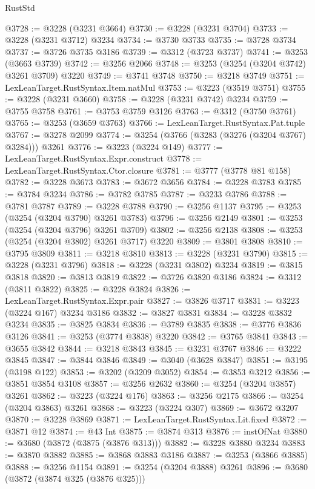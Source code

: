 \begin{lexlean}{RustStd}
\begin{coremodule}
{\begin{coremodule}
{{{{{{{{{{{{{{{{{{{{{{{{{{{{{{{{{{{{{@3728 := @3228 (@3231 @3664)
@3730 := @3228 (@3231 @3704)
@3733 := @3228 (@3231 @3712) @3234
@3734 := @3730 @3733
@3735 := @3728 @3734
@3737 := @3726 @3735 @3186
@3739 := @3312 (@3723 @3737)
@3741 := @3253 (@3663 @3739)
@3742 := @3256 @2066
@3748 := @3253 (@3254 (@3204 @3742) @3261 @3709) @3220
@3749 := @3741 @3748
@3750 := @3218 @3749
@3751 := LexLeanTarget.RustSyntax.Item.natMul
@3753 := @3223 (@3519 @3751)
@3755 := @3228 (@3231 @3660)
@3758 := @3228 (@3231 @3742) @3234
@3759 := @3755 @3758
@3761 := @3753 @3759 @3126
@3763 := @3312 (@3750 @3761)
@3765 := @3253 (@3659 @3763)
@3766 := LexLeanTarget.RustSyntax.Pat.tuple
@3767 := @3278 @2099
@3774 := @3254 (@3766 (@3283 (@3276 (@3204 @3767) @3284))) @3261
@3776 := @3223 (@3224 @149)
@3777 := LexLeanTarget.RustSyntax.Expr.construct
@3778 := LexLeanTarget.RustSyntax.Ctor.closure
@3781 := @3777 (@3778 @81 @158)
@3782 := @3228 @3673
@3783 := @3672 @3656
@3784 := @3228 @3783
@3785 := @3784 @3234
@3786 := @3782 @3785
@3787 := @3233 @3786
@3788 := @3781 @3787
@3789 := @3228 @3788
@3790 := @3256 @1137
@3795 := @3253 (@3254 (@3204 @3790) @3261 @3783)
@3796 := @3256 @2149
@3801 := @3253 (@3254 (@3204 @3796) @3261 @3709)
@3802 := @3256 @2138
@3808 := @3253 (@3254 (@3204 @3802) @3261 @3717) @3220
@3809 := @3801 @3808
@3810 := @3795 @3809
@3811 := @3218 @3810
@3813 := @3228 (@3231 @3790)
@3815 := @3228 (@3231 @3796)
@3818 := @3228 (@3231 @3802) @3234
@3819 := @3815 @3818
@3820 := @3813 @3819
@3822 := @3726 @3820 @3186
@3824 := @3312 (@3811 @3822)
@3825 := @3228 @3824
@3826 := LexLeanTarget.RustSyntax.Expr.pair
@3827 := @3826 @3717
@3831 := @3223 (@3224 @167) @3234 @3186
@3832 := @3827 @3831
@3834 := @3228 @3832 @3234
@3835 := @3825 @3834
@3836 := @3789 @3835
@3838 := @3776 @3836 @3126
@3841 := @3253 (@3774 @3838) @3220
@3842 := @3765 @3841
@3843 := @3655 @3842
@3844 := @3218 @3843
@3845 := @3231 @3767
@3846 := @3222 @3845
@3847 := @3844 @3846
@3849 := @3040 (@3628 @3847)
@3851 := @3195 (@3198 @122)
@3853 := @3202 (@3209 @3052)
@3854 := @3853 @3212
@3856 := @3851 @3854 @3108
@3857 := @3256 @2632
@3860 := @3254 (@3204 @3857) @3261
@3862 := @3223 (@3224 @176)
@3863 := @3256 @2175
@3866 := @3254 (@3204 @3863) @3261
@3868 := @3223 (@3224 @307)
@3869 := @3672 @3207
@3870 := @3228 @3869
@3871 := LexLeanTarget.RustSyntax.Lit.fixed
@3872 := @3871 @12
@3874 := @43 Int
@3875 := @3874 @313
@3876 := instOfNat
@3880 := @3680 (@3872 (@3875 (@3876 @313)))
@3882 := @3228 @3880 @3234
@3883 := @3870 @3882
@3885 := @3868 @3883 @3186
@3887 := @3253 (@3866 @3885)
@3888 := @3256 @1154
@3891 := @3254 (@3204 @3888) @3261
@3896 := @3680 (@3872 (@3874 @325 (@3876 @325)))
}}}}}}}}}}}}}}}}}}}}}}}}}}}}}}}}}}}}}
\end{coremodule}}
\end{coremodule}
\end{lexlean}
